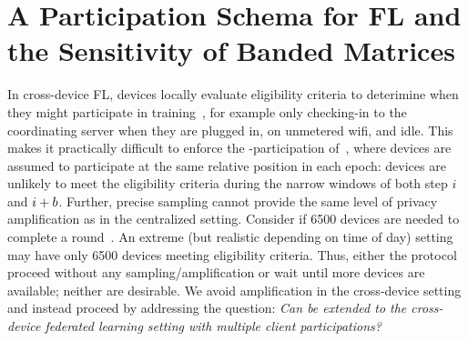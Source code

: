 \documentclass{article}
\begin{document}
\section{A Participation Schema for FL and the Sensitivity of Banded Matrices}\label{sec:sensitivity}
\vspace{-0.5em} %
%
In cross-device FL, devices locally evaluate eligibility criteria to deterimine when they might participate in training~\citep{FLO,bonawitz2019towards}, for example only checking-in to the coordinating server when they are plugged in, on unmetered wifi, and idle. This makes it practically difficult to enforce the \multiepoch-participation of~\citet{choquette2022multi}, where devices are assumed to participate at the same relative position in each epoch: devices are unlikely to meet the eligibility criteria during the narrow windows of both step $i$ and $i + b$. Further, precise sampling cannot provide the same level of privacy amplification as in the centralized setting. Consider if 6500 devices are needed to complete a round~\cite{xu2023federated}. An extreme (but realistic depending on time of day) setting may have only 6500 devices meeting eligibility criteria. Thus, either the protocol proceed without any sampling/amplification or wait until  more devices are available; neither are desirable. We avoid amplification in the cross-device setting and instead proceed by addressing the question: \emph{Can \MFFTRL be extended to the cross-device federated learning setting with multiple client participations?} 
\end{document}
